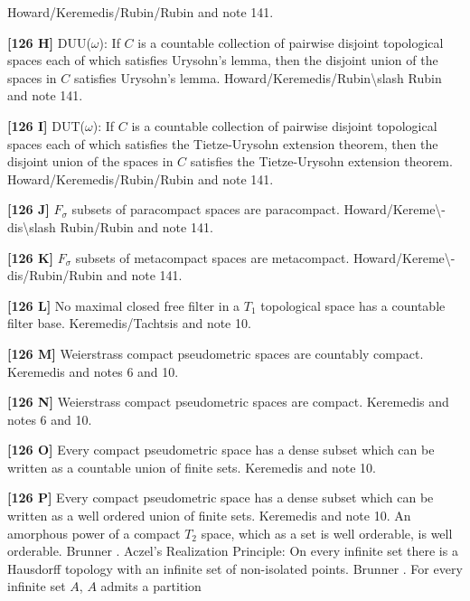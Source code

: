 \ac{Howard/Keremedis/Rubin/Rubin} \cite{1998a} and note 141.
\smallskip
\item{}{\bf [126 H]} DUU($\omega$): If $C$ is a countable collection
of pairwise disjoint topological spaces each of which satisfies
Urysohn's lemma, then the disjoint union of the
spaces in $C$ satisfies Urysohn's lemma.
\ac{Howard/Keremedis/Rubin\slash Rubin} \cite{1998a} and note 141.
\smallskip
\item{}{\bf [126 I]} DUT($\omega$): If $C$ is a countable collection
of pairwise disjoint topological spaces each of which satisfies
the Tietze-Urysohn extension theorem, then the disjoint union
of the spaces in $C$ satisfies the Tietze-Urysohn extension theorem.
\ac{Howard/Keremedis/Rubin/Rubin} \cite{1998a} and note 141.
\smallskip
\item{}{\bf [126 J]} $F_\sigma$ subsets of paracompact spaces are
paracompact. \ac{Howard/Kereme\-dis\slash Rubin/Rubin} \cite{1997b} and
note 141.
\smallskip
\item{}{\bf [126 K]} $F_\sigma$ subsets of metacompact spaces are
metacompact. \ac{Howard/Kereme\-dis/Rubin/Rubin} \cite{1997b} and
note 141.
\smallskip
\item{}{\bf [126 L]} No maximal closed free filter in a $T_1$
topological space has a countable filter base. \ac{Keremedis/Tachtsis}
\cite{1999b} and note 10.
\smallskip
\item{}{\bf [126 M]} Weierstrass compact pseudometric spaces are
countably compact.  \ac{Keremedis} \cite{1999a} and notes 6 and
10.
\smallskip
\item{}{\bf [126 N]} Weierstrass compact pseudometric spaces are
compact.  \ac{Keremedis} \cite{1999a} and notes 6 and 10.
\smallskip
\item{}{\bf [126 O]} Every compact pseudometric space has a dense
subset which can be written as a countable union of finite sets.
\ac{Keremedis} \cite{1999a} and note 10.
\smallskip
\item{}{\bf [126 P]} Every compact pseudometric space has a dense
subset which can be written as a well ordered union of finite
sets.  \ac{Keremedis} \cite{1999a} and note 10.
\medskip
{} An amorphous power of a compact $T_2$ space, which
as a set is well orderable, is well orderable.  \ac{Brunner} \cite{1984b}.
\medskip
{} Aczel's Realization Principle: On every infinite
set there is a Hausdorff topology with an infinite set of non-isolated
points.  \ac{Brunner} \cite{1984f}. 
\medskip
{} For every infinite set $A$, $A$ admits a partition
